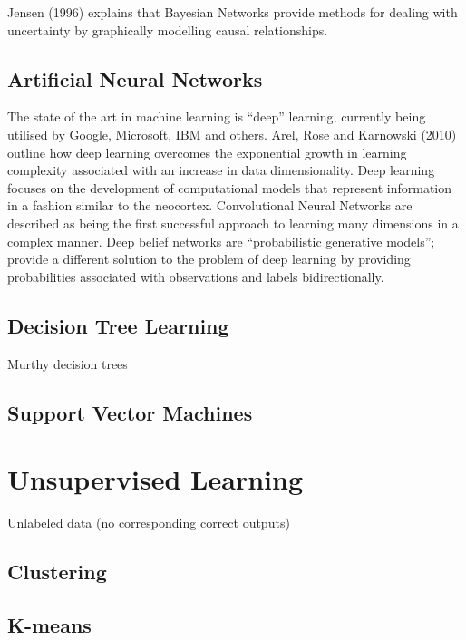 Jensen (1996) explains that Bayesian Networks provide methods for dealing with uncertainty by graphically modelling causal relationships.

\subsection{Artificial Neural Networks}

The state of the art in machine learning is “deep” learning, currently being utilised by Google, Microsoft, IBM and others. Arel, Rose and Karnowski (2010) outline how deep learning overcomes the exponential growth in learning complexity associated with an increase in data dimensionality. Deep learning focuses on the development of computational models that represent information in a fashion similar to the neocortex. Convolutional Neural Networks are described as being the first successful approach to learning many dimensions in a complex manner. Deep belief networks are “probabilistic generative models”; provide a different solution to the problem of deep learning by providing probabilities associated with observations and labels bidirectionally.

\subsection{Decision Tree Learning}

Murthy\cite{murthy1998automatic} decision trees

\subsection{Support Vector Machines}

\section{Unsupervised Learning}

Unlabeled data (no corresponding correct outputs)

\subsection{Clustering}

\subsection{K-means}


